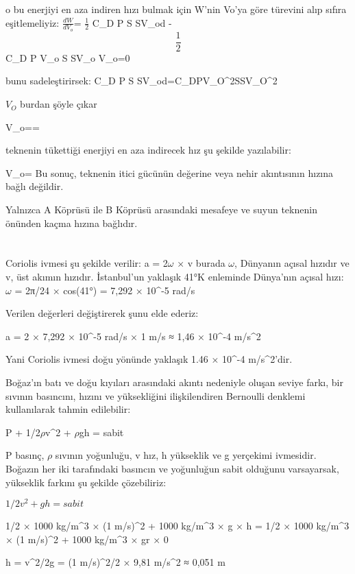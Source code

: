 \documentclass[12pt]{article}
\begin{document}
o bu enerjiyi en aza indiren hızı bulmak için W'nin Vo'ya göre türevini alıp sıfıra eşitlemeliyiz:
\bigbreak
$\frac{dW}{dV_o}$= $\frac{1}{2}$ \times C_D \times P \times S \times SV_od - $$\frac{1}{2}$$ \times C_D \times P \times V_o \times S \times SV_o   \times V_o=0

bunu sadeleştirirsek:
\bigbreak
C_D \times P \times S \times SV_od=C_D\times P\times V_O^2\times S\times SV_O^2

$V_O$ burdan şöyle çıkar

V_o==

teknenin tükettiği enerjiyi en aza indirecek hız şu şekilde yazılabilir:

V_o=
\bigbreak
Bu sonuç, teknenin itici gücünün değerine veya nehir akıntısının hızına bağlı değildir.

Yalnızca A Köprüsü ile B Köprüsü arasındaki mesafeye ve suyun teknenin önünden kaçma hızına bağlıdır.

\newpage
\section{}
Coriolis ivmesi şu şekilde verilir:
a = 2$\omega$ × v
burada $\omega$, Dünyanın açısal hızıdır ve v, üst akımın hızıdır. İstanbul'un yaklaşık 41°K enleminde Dünya'nın açısal hızı:
\bigbreak
$\omega$ = 2π/24 × cos(41°) = 7,292 × 10^-5 rad/s

Verilen değerleri değiştirerek şunu elde ederiz:

a = 2 × 7,292 × 10^-5 rad/s × 1 m/s ≈ 1,46 × 10^-4 m/s^2

Yani Coriolis ivmesi doğu yönünde yaklaşık 1.46 × 10^-4 m/s^2'dir.

Boğaz'ın batı ve doğu kıyıları arasındaki akıntı nedeniyle oluşan seviye farkı, bir sıvının basıncını, hızını ve yüksekliğini ilişkilendiren Bernoulli denklemi kullanılarak tahmin edilebilir:

P + 1/2$\rho$v^2 + $\rho$gh = sabit

P basınç, $\rho$ sıvının yoğunluğu, v hız, h yükseklik ve g yerçekimi ivmesidir. Boğazın her iki tarafındaki basıncın ve yoğunluğun sabit olduğunu varsayarsak, yükseklik farkını şu şekilde çözebiliriz:

$1/2$\rho$v^2 + $\rho$gh = sabit$

1/2 × 1000 kg/m^3 × (1 m/s)^2 + 1000 kg/m^3 × g × h = 1/2 × 1000 kg/m^3 × (1 m/s)^2 + 1000 kg/m^3 × gr × 0

h = v^2/2g = (1 m/s)^2/2 × 9,81 m/s^2 ≈ 0,051 m
\end{document}

